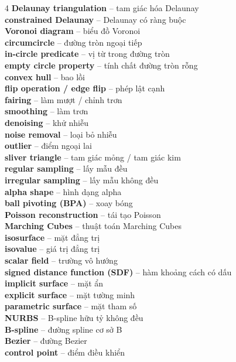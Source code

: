 \begin{multicols}{4}
\textbf{Delaunay triangulation} -- tam giác hóa Delaunay\\
\textbf{constrained Delaunay} -- Delaunay có ràng buộc\\
\textbf{Voronoi diagram} -- biểu đồ Voronoi\\
\textbf{circumcircle} -- đường tròn ngoại tiếp\\
\textbf{in-circle predicate} -- vị từ trong đường tròn\\
\textbf{empty circle property} -- tính chất đường tròn rỗng\\
\textbf{convex hull} -- bao lồi\\
\textbf{flip operation / edge flip} -- phép lật cạnh\\
\textbf{fairing} -- làm mượt / chỉnh trơn\\
\textbf{smoothing} -- làm trơn\\
\textbf{denoising} -- khử nhiễu\\
\textbf{noise removal} -- loại bỏ nhiễu\\
\textbf{outlier} -- điểm ngoại lai\\
\textbf{sliver triangle} -- tam giác mỏng / tam giác kim\\
\textbf{regular sampling} -- lấy mẫu đều\\
\textbf{irregular sampling} -- lấy mẫu không đều\\
\textbf{alpha shape} -- hình dạng alpha\\
\textbf{ball pivoting (BPA)} -- xoay bóng\\
\textbf{Poisson reconstruction} -- tái tạo Poisson\\
\textbf{Marching Cubes} -- thuật toán Marching Cubes\\
\textbf{isosurface} -- mặt đẳng trị\\
\textbf{isovalue} -- giá trị đẳng trị\\
\textbf{scalar field} -- trường vô hướng\\
\textbf{signed distance function (SDF)} -- hàm khoảng cách có dấu\\
\textbf{implicit surface} -- mặt ẩn\\
\textbf{explicit surface} -- mặt tường minh\\
\textbf{parametric surface} -- mặt tham số\\
\textbf{NURBS} -- B-spline hữu tỷ không đều\\
\textbf{B-spline} -- đường spline cơ sở B\\
\textbf{Bezier} -- đường Bezier\\
\textbf{control point} -- điểm điều khiển\\

\end{multicols}
